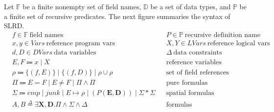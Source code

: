 \documentclass{article}
\theoremstyle{plain}
\begin{document}
\newcommand{\FF}{\mathbb{F}}
\newcommand{\DD}{\mathbb{D}}
\newcommand{\PP}{\mathbb{P}}

Let $\FF$ be a finite nonempty set of field names, $\DD$ be a set of data types, and $\PP$ be a finite set of recursive predicates. The next figure summaries the syntax of SLRD. 
\begin{align*}
&f \in \mathbb{F} \ \text{field names} & &P \in \mathbb{P} \ \text{recursive definition name}\\
&x,y \in Vars \ \text{reference program vars}& &X,Y \in LVars \ \text{reference logical vars}\\
&d,D \in DVars \ \text{data\ variables}& &\Delta \ \text{data constraints}\\
&E,F \Coloneqq x \mid X & &\text{reference  variables}\\
&\rho \Coloneqq \{(f,E)\} \mid \{(f,D)\}  \mid \rho\cup \rho & &\text{set of field references}\\
&\Pi \Coloneqq E=F \mid E \ne F  \mid \Pi \wedge  \Pi & &\text{pure formulas}\\
&\Sigma \Coloneqq emp \mid junk \mid E \mapsto \rho \mid (P(\mathbf{E},\mathbf{D})) \mid \Sigma *\Sigma & &\text{spatial formulas}\\
&A,B \overset{\Delta}{=} \exists \mathbf{X},\mathbf{D}. \Pi \wedge  \Sigma  \wedge  \Delta & &\text{formulas}\\
\end{align*}
\end{document}

